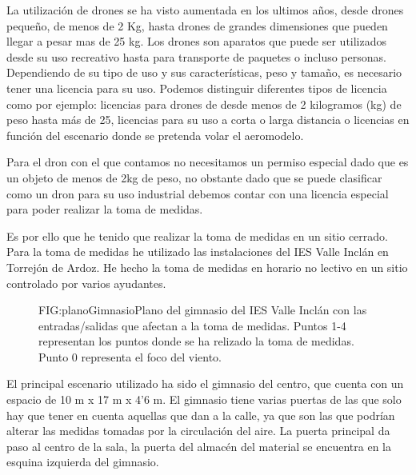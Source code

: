 
La utilización de drones se ha visto aumentada en los ultimos años, desde drones pequeño, de menos de 2 Kg, hasta drones de grandes dimensiones que pueden llegar a pesar mas de 25 kg. Los drones son aparatos que puede ser utilizados desde su uso recreativo hasta para transporte de paquetes o incluso personas. Dependiendo de su tipo de uso y sus características, peso y tamaño, es necesario tener una licencia para su uso. Podemos distinguir diferentes tipos de licencia como por ejemplo: licencias para drones de desde menos de 2 kilogramos (kg) de peso hasta más de 25, licencias para su uso a corta o larga distancia o licencias en función del escenario donde se pretenda volar el aeromodelo.

Para el dron con el que contamos no necesitamos un permiso especial dado que es un objeto de menos de 2kg de peso, no obstante dado que se puede clasificar como un dron para su uso industrial debemos contar con una licencia especial para poder realizar la toma de medidas.

Es por ello que he tenido que realizar la toma de medidas en un sitio cerrado. Para la toma de medidas he utilizado las instalaciones del IES Valle Inclán en Torrejón de Ardoz. He hecho la toma de medidas en horario no lectivo en un sitio controlado por varios ayudantes.

\begin{figure}[Plano gimnasio IES Valle Inclán.]{FIG:planoGimnasio}{Plano del gimnasio del IES Valle Inclán con las entradas/salidas que afectan a la toma de medidas. Puntos 1-4 representan los puntos donde se ha relizado la toma de medidas. Punto 0 representa el foco del viento.}
\end{figure}

El principal escenario utilizado ha sido el gimnasio del centro, que cuenta con un espacio de 10 m x 17 m x 4'6 m. El gimnasio tiene varias puertas de las que solo hay que tener en cuenta aquellas que dan a la calle, ya que son las que podrían alterar las medidas tomadas por la circulación del aire. La puerta principal da paso al centro de la sala, la puerta del almacén del material se encuentra en la esquina izquierda del gimnasio. 

